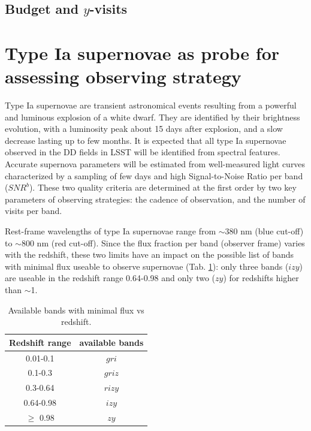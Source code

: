 \documentclass[\docopts]{\docclass}
\newcommand{\snrb}{\mbox{$SNR^b$}}
\newcommand{\bg}{{$g$}}
\newcommand{\br}{{$r$}}
\newcommand{\bi}{{$i$}}
\newcommand{\bz}{{$z$}}
\newcommand{\by}{{$y$}}
\begin{document}
{\subsection{Budget and \by-visits}


\section{Type Ia supernovae as probe for assessing observing strategy}
\label{sec:snprobes}
Type Ia supernovae are transient astronomical events resulting from a powerful and luminous explosion of a white dwarf. They are identified by their brightness evolution, with a luminosity peak about 15 days after explosion, and a slow decrease lasting up to few months. It is expected that all type Ia supernovae observed in the DD fields in LSST will be identified from spectral features. Accurate supernova parameters will be estimated from well-measured light curves characterized by a sampling of few days and high Signal-to-Noise Ratio per band (\snrb). These two quality criteria are determined at the first order by two key parameters of observing strategies: the cadence of observation, and the number of visits per band.
\par
Rest-frame wavelengths of type Ia supernovae range from $\sim$380 nm (blue cut-off) to $\sim$800 nm (red cut-off). Since the flux fraction per band (observer frame) varies with the redshift, these two limits have an impact on the possible list of bands with minimal flux useable to observe supernovae (Tab. \ref{tab:zfilters}): only three bands (\bi\bz\by) are useable in the redshift range 0.64-0.98 and only two (\bz\by) for redshifts higher than $\sim$1. 

\begin{table}[!htbp]
  \caption{Available bands with minimal flux vs redshift.}\label{tab:zfilters}
  \begin{center}
    \begin{tabular}{c|c}
      \hline
      \hline
      Redshift range & available bands \\
      \hline
      0.01-0.1 & \bg\br\bi\\
      0.1-0.3 & \bg\br\bi\bz \\
      0.3-0.64 & \br\bi\bz\by \\
      0.64-0.98 & \bi\bz\by \\
      $\geq$ 0.98 & \bz\by \\
      \hline
      \end{tabular}
  \end{center}
\end{table}

}
\end{document}
